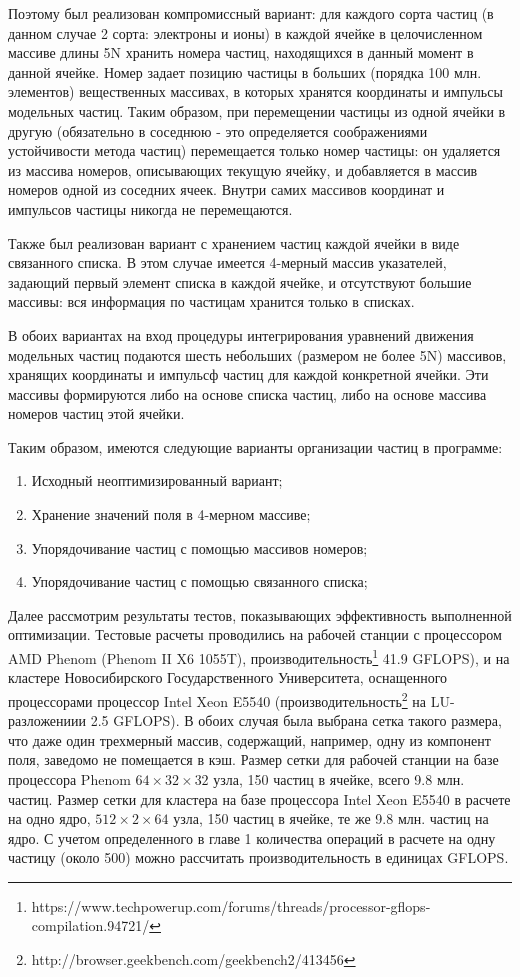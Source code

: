 Поэтому был реализован компромиссный вариант: для каждого сорта частиц (в данном случае 2 сорта: электроны и ионы) в каждой ячейке в целочисленном массиве длины 5N хранить номера частиц, находящихся в данный момент в данной ячейке. Номер задает позицию частицы в больших (порядка 100 млн. элементов) вещественных массивах, в которых хранятся координаты и импульсы модельных частиц. Таким образом, при перемещении частицы из одной ячейки в другую (обязательно в соседнюю - это определяется соображениями устойчивости метода частиц) перемещается только номер частицы: он удаляется из массива номеров, описывающих текущую ячейку, и добавляется в массив номеров одной из соседних ячеек. Внутри самих массивов координат и импульсов частицы никогда не перемещаются. 

Также был реализован вариант с хранением частиц каждой ячейки в виде связанного списка. В этом случае имеется 4-мерный массив указателей, задающий первый элемент списка в каждой ячейке, и отсутствуют большие массивы: вся информация по частицам хранится только в списках. 

В обоих вариантах на вход процедуры интегрирования уравнений движения модельных частиц подаются шесть небольших (размером не более 5N) массивов, хранящих координаты и импульсф частиц для каждой конкретной ячейки. Эти массивы формируются либо на основе списка частиц, либо на основе массива номеров частиц этой ячейки. 

Таким образом, имеются следующие варианты организации частиц в программе:
\begin{enumerate}
	\item Исходный неоптимизированный вариант; 
	\item Хранение значений поля в 4-мерном массиве; 
	\item Упорядочивание частиц с помощью массивов номеров; 
	\item Упорядочивание частиц с помощью связанного списка; 
\end{enumerate}

Далее рассмотрим результаты тестов, показывающих эффективность выполненной оптимизации. Тестовые расчеты проводились на рабочей станции с процессором AMD Phenom (Phenom II X6 1055T),  производительность\footnote{https://www.techpowerup.com/forums/threads/processor-gflops-compilation.94721/} 41.9 GFLOPS), и на кластере Новосибирского Государственного Университета, оснащенного процессорами процессор Intel Xeon  E5540 (производительность\footnote{http://browser.geekbench.com/geekbench2/413456} на LU-разложениии 2.5 GFLOPS). В обоих случая была выбрана сетка такого размера, что даже один трехмерный массив, содержащий, например, одну из компонент поля, заведомо не помещается в кэш. 
Размер сетки для рабочей станции на базе процессора Phenom  $64\times32\times32$ узла, 150 частиц в ячейке, всего 9.8 млн. частиц. Размер сетки для кластера на базе процессора Intel Xeon  E5540 в расчете на одно ядро, $512\times2\times64$ узла, 150 частиц в ячейке, те же 9.8 млн. частиц на ядро. С учетом определенного в главе 1 количества операций в расчете на одну частицу (около 500) можно рассчитать производительность в единицах GFLOPS.

